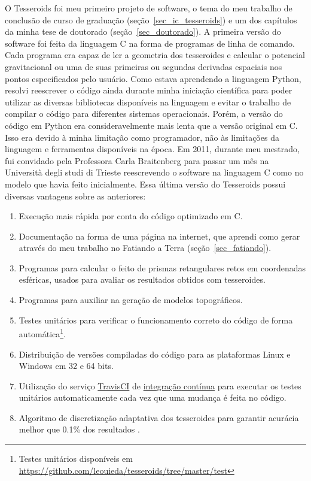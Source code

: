 \documentclass[10pt,a4paper,oneside]{book}
\newcommand{\Trieste}{Università degli studi di Trieste}
\begin{document}
O Tesseroids foi meu primeiro projeto de software, o tema do meu
trabalho de conclusão de curso de graduação (seção~\ref{sec_ic_tesseroids})
e um dos capítulos da minha tese de doutorado (seção~\ref{sec_doutorado}).
A primeira versão do software foi feita da linguagem C na forma de programas
de linha de comando.
Cada programa era capaz de ler a geometria dos tesseroides e calcular o
potencial gravitacional ou uma de suas primeiras ou segundas derivadas
espaciais nos pontos especificados pelo usuário.
Como estava aprendendo a linguagem Python, resolvi reescrever o código ainda
durante minha iniciação científica para poder utilizar as diversas bibliotecas
disponíveis na linguagem e evitar o trabalho de compilar o código para
diferentes sistemas operacionais.
Porém, a versão do código em Python era consideravelmente mais lenta que a
versão original em C.
Isso era devido à minha limitação como programador, não às limitações da
linguagem e ferramentas disponíveis na época.
Em 2011, durante meu mestrado, fui convidado pela Professora Carla Braitenberg
para passar um mês na \Trieste{} reescrevendo o software na linguagem C como no
modelo que havia feito inicialmente.
Essa última versão do Tesseroids possui diversas vantagens sobre as anteriores:

\begin{enumerate}
  \item Execução mais rápida por conta do código optimizado em C.
  \item Documentação na forma de uma página na internet, que aprendi como gerar
    através do meu trabalho no Fatiando a Terra (seção~\ref{sec_fatiando}).
  \item Programas para calcular o feito de prismas retangulares retos em
    coordenadas esféricas, usados para avaliar os resultados obtidos com
    tesseroides.
  \item Programas para auxiliar na geração de modelos topográficos.
  \item Testes unitários para verificar o funcionamento correto do código de
    forma automática\footnote{Testes unitários disponíveis em \url{https://github.com/leouieda/tesseroids/tree/master/test}}.
  \item Distribuição de versões compiladas do código para as plataformas Linux
    e Windows em 32 e 64 bits.
  \item Utilização do serviço \href{https://travis-ci.org/github/leouieda/tesseroids}{TravisCI} de
    \href{https://pt.wikipedia.org/wiki/Integra%C3%A7%C3%A3o_cont%C3%ADnua}{integração contínua}
    para executar os testes unitários automaticamente cada vez que uma mudança
    é feita no código.
  \item Algoritmo de discretização adaptativa dos tesseroides para garantir
    acurácia melhor que 0.1\% dos resultados \citep{Uieda2016}.
\end{enumerate}
\end{document}
